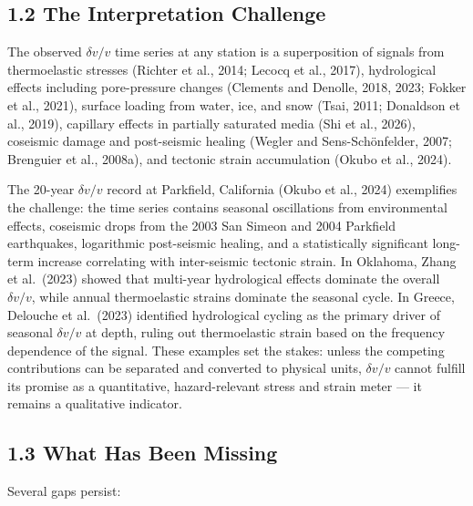 \documentclass[12pt]{article}
\begin{document}
\subsection{1.2 The Interpretation
Challenge}\label{the-interpretation-challenge}

The observed \(\delta v/v\) time series at any station is a
superposition of signals from thermoelastic stresses (Richter et al.,
2014; Lecocq et al., 2017), hydrological effects including pore-pressure
changes (Clements and Denolle, 2018, 2023; Fokker et al., 2021), surface
loading from water, ice, and snow (Tsai, 2011; Donaldson et al., 2019),
capillary effects in partially saturated media (Shi et al., 2026),
coseismic damage and post-seismic healing (Wegler and Sens-Schönfelder,
2007; Brenguier et al., 2008a), and tectonic strain accumulation (Okubo
et al., 2024).

The 20-year \(\delta v/v\) record at Parkfield, California (Okubo et
al., 2024) exemplifies the challenge: the time series contains seasonal
oscillations from environmental effects, coseismic drops from the 2003
San Simeon and 2004 Parkfield earthquakes, logarithmic post-seismic
healing, and a statistically significant long-term increase correlating
with inter-seismic tectonic strain. In Oklahoma, Zhang et al.~(2023)
showed that multi-year hydrological effects dominate the overall
\(\delta v/v\), while annual thermoelastic strains dominate the seasonal
cycle. In Greece, Delouche et al.~(2023) identified hydrological cycling
as the primary driver of seasonal \(\delta v/v\) at depth, ruling out
thermoelastic strain based on the frequency dependence of the signal.
These examples set the stakes: unless the competing contributions can be
separated and converted to physical units, \(\delta v/v\) cannot fulfill
its promise as a quantitative, hazard-relevant stress and strain meter
--- it remains a qualitative indicator.

\subsection{1.3 What Has Been Missing}\label{what-has-been-missing}

Several gaps persist:
\end{document}
